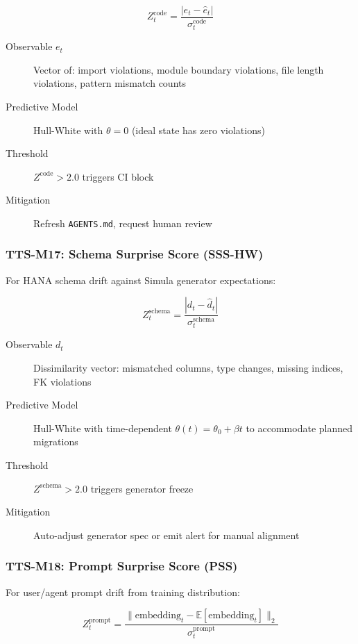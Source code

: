 \begin{equation}
\boxed{
Z_t^{\text{code}} = \frac{|e_t - \hat{e}_t|}{\sigma_t^{\text{code}}}
}
\end{equation}

\begin{description}
  \item[Observable $e_t$] Vector of: import violations, module boundary violations,
        file length violations, pattern mismatch counts
  \item[Predictive Model] Hull-White with $\theta = 0$ (ideal state has zero violations)
  \item[Threshold] $Z^{\text{code}} > 2.0$ triggers CI block
  \item[Mitigation] Refresh \texttt{AGENTS.md}, request human review
\end{description}

\subsubsection{TTS-M17: Schema Surprise Score (SSS-HW)}

For HANA schema drift against Simula generator expectations:

\begin{equation}
\boxed{
Z_t^{\text{schema}} = \frac{|d_t - \hat{d}_t|}{\sigma_t^{\text{schema}}}
}
\end{equation}

\begin{description}
  \item[Observable $d_t$] Dissimilarity vector: mismatched columns, type changes,
        missing indices, FK violations
  \item[Predictive Model] Hull-White with time-dependent $\theta(t) = \theta_0 + \beta t$
        to accommodate planned migrations
  \item[Threshold] $Z^{\text{schema}} > 2.0$ triggers generator freeze
  \item[Mitigation] Auto-adjust generator spec or emit alert for manual alignment
\end{description}

\subsubsection{TTS-M18: Prompt Surprise Score (PSS)}

For user/agent prompt drift from training distribution:

\begin{equation}
\boxed{
Z_t^{\text{prompt}} = \frac{\|\text{embedding}_t - \mathbb{E}[\text{embedding}_t]\|_2}{\sigma_t^{\text{prompt}}}
}
\end{equation}

